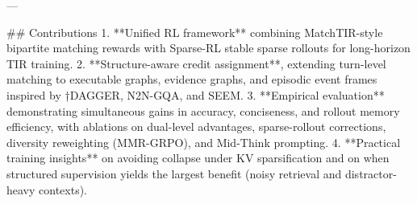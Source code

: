 ---

## Contributions
1. **Unified RL framework** combining MatchTIR-style bipartite matching rewards with Sparse-RL stable sparse rollouts for long-horizon TIR training.
2. **Structure-aware credit assignment**, extending turn-level matching to executable graphs, evidence graphs, and episodic event frames inspired by †DAGGER, N2N-GQA, and SEEM.
3. **Empirical evaluation** demonstrating simultaneous gains in accuracy, conciseness, and rollout memory efficiency, with ablations on dual-level advantages, sparse-rollout corrections, diversity reweighting (MMR-GRPO), and Mid-Think prompting.
4. **Practical training insights** on avoiding collapse under KV sparsification and on when structured supervision yields the largest benefit (noisy retrieval and distractor-heavy contexts).